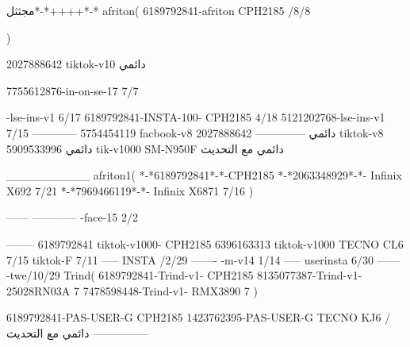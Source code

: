 مجثثل*-*++++*-*
afriton(
6189792841-afriton CPH2185  /8/8

)

2027888642 tiktok-v10
دائمي

7755612876-in-on-se-17 7/7

-lse-ins-v1 6/17
6189792841-INSTA-100- CPH2185 4/18
5121202768-lse-ins-v1 7/15
------------
5754454119 facbook-v8
دائمي
--------------
2027888642 tiktok-v8
دائمي
5909533996 tik-v1000  SM-N950F
دائمي مع التحديث

__________
afriton1(
*-*6189792841*-*-CPH2185
*-*2063348929*-*-  Infinix X692  7/21
*-*7969466119*-*-  Infinix X6871  7/16
)


------
------------
-face-15 2/2

--------
6189792841 tiktok-v1000- CPH2185 
6396163313 tiktok-v1000 TECNO CL6  7/15
 tiktok-F   7/11
-----
 INSTA /2/29
-------
-m-v14 1/14
-----
userinsta 6/30
------
-twe/10/29
Trind(
6189792841-Trind-v1- CPH2185 
8135077387-Trind-v1- 25028RN03A 7
7478598448-Trind-v1- RMX3890 7
)


6189792841-PAS-USER-G CPH2185 
1423762395-PAS-USER-G TECNO KJ6  /دائمي مع التحديث
    ---------------
